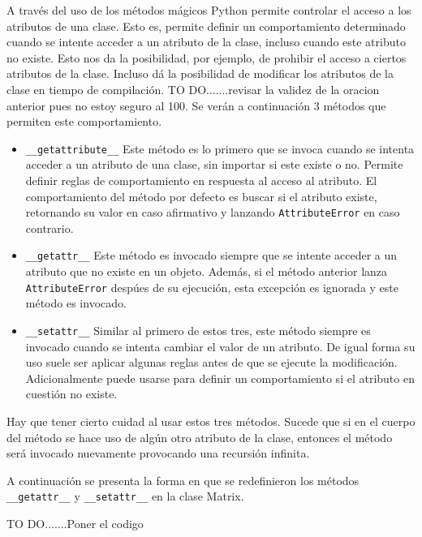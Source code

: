 \documentclass[10pt]{article}
\newcommand{\mgc}[1]{\texttt{\_\_#1\_\_}}
\newcommand{\csl}[1]{\texttt{#1}}
\newcommand{\todo}[1]{\color{red}TO DO.......#1\color{black}}
\begin{document}
A trav\'es del uso de los m\'etodos m\'agicos Python permite controlar el acceso a los atributos de una clase. Esto es, permite definir un comportamiento determinado cuando se intente acceder a un atributo de la clase, incluso cuando este atributo no existe. Esto nos da la posibilidad, por ejemplo, de prohibir el acceso a ciertos atributos de la clase. Incluso d\'a la posibilidad de modificar los atributos de la clase en tiempo de compilaci\'on. \todo{revisar la validez de la oracion anterior pues no estoy seguro al 100}. Se ver\'an a continuaci\'on 3  m\'etodos que permiten este comportamiento.

\begin{itemize}
	\item \mgc{getattribute} Este m\'etodo es lo primero que se invoca cuando se intenta acceder a un atributo de una clase, sin importar si este existe o no. Permite definir reglas de comportamiento en respuesta al acceso al atributo. El comportamiento del m\'etodo por defecto es buscar si el atributo existe, retornando su valor en caso afirmativo y lanzando \csl{AttributeError} en caso contrario.
	\item \mgc{getattr} Este m\'etodo es invocado siempre que se intente acceder a un atributo que no existe en un objeto. Adem\'as, si el m\'etodo anterior lanza \csl{AttributeError} desp\'ues de su ejecuci\'on, esta excepci\'on es ignorada y este m\'etodo es invocado. 
	\item \mgc{setattr} Similar al primero de estos tres, este m\'etodo siempre es invocado cuando se intenta cambiar el valor de un atributo. De igual forma su uso suele ser aplicar algunas reglas antes de que se ejecute la modificaci\'on. Adicionalmente puede usarse para definir un comportamiento si el atributo en cuesti\'on no existe.
\end{itemize}

Hay que tener cierto cuidad al usar estos tres m\'etodos. Sucede que si en el cuerpo del m\'etodo se hace uso de alg\'un otro atributo de la clase, entonces el m\'etodo ser\'a invocado nuevamente provocando una recursi\'on infinita.

A continuaci\'on se presenta la forma en que se redefinieron los m\'etodos \mgc{getattr} y \mgc{setattr} en la clase Matrix.

\todo{Poner el codigo}
\end{document}
